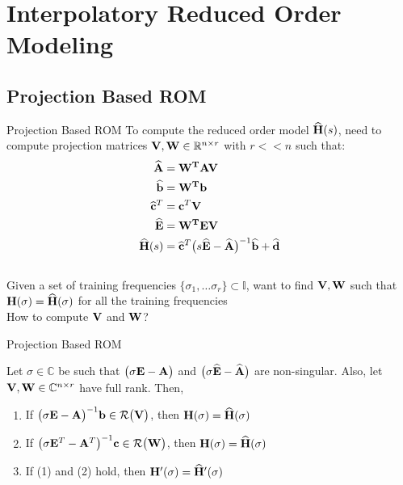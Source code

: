 \section{Interpolatory Reduced Order Modeling}

\subsection{Projection Based ROM}

\begin{frame}{Projection Based ROM}
    To compute the reduced order model ${\bf \widehat{H}}(s)$, need to compute projection matrices ${\bf V}, {\bf W} \in \mathbb{R}^{n \times r}$ with $r << n$ such that:
\begin{align*}
    {\bf \widehat{A} } & = {\bf W^{T}} {\bf A} {\bf V} \\
    {\bf \widehat{b} } & = {\bf W^{T}} {\bf b} \\
    {\bf \widehat{c}}^T & = {\bf c}^T {\bf V} \\
    {\bf \widehat{E} } & = {\bf W^{T}} {\bf E} {\bf V}\\
    {\bf \widehat{H}}(s) & = {\bf \widehat{c}}^T \big( s{\bf \widehat{E}}-{\bf \widehat{A}} \big)^{-1} {\bf \widehat{b}} + {\bf \widehat{d}} 
\end{align*}
\\
Given a set of training frequencies $\{\sigma_1, \dots \sigma_r\} \subset \mathbb{I}$, want to find ${\bf V}, {\bf W}$ such that ${\bf H}(\sigma) = {\bf \widehat H}(\sigma)$ for all the training frequencies\\
\bigskip
How to compute ${\bf V}$ and ${\bf W}$?
    
\end{frame}
\begin{frame}{Projection Based ROM}
\begin{theorem}
Let \(\sigma \in \mathbb{C}\) be such that \(\big(\sigma{\bf E}-{\bf A} \big)\) and \(\big(\sigma{\bf \widehat E}-{\bf \widehat A} \big)\) are non-singular. Also, let \({\bf V},{\bf W} \in \mathbb{C}^{n \times r}\) have full rank. Then,\\
\bigskip
\begin{enumerate}
    \item <1-> If \(\big( \sigma{\bf E}-{\bf A} \big)^{-1}{\bf b} \in \mathcal{R}\big({\bf V}\big) \), then \({\bf H}(\sigma) = {\bf \widehat{H}}(\sigma)\)
    \item <1-> If \(\big( \sigma{\bf E}^T-{\bf A}^T \big)^{-1} {\bf c} \in \mathcal{R}\big({\bf W}\big) \), then \({\bf H}(\sigma) = {\bf \widehat{H}}(\sigma)\)
    \item If (1) and (2) hold, then \({\bf H}'(\sigma) = {\bf \widehat H}'(\sigma)\)
\end{enumerate}

\end{theorem} 
\noindent

\end{frame}

